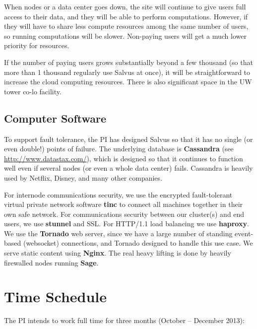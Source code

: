 \documentclass[11pt]{article}
\begin{document}
When nodes or a data center goes down, the site will continue to give
users full access to their data, and they will be able to perform
computations.  However, if they will have to share less compute
resources among the same number of users, so running computations will
be slower.  Non-paying users will get a much lower priority for
resources.   

If the number of paying users grows substantially beyond a few
thousand (so that more than 1 thousand regularly use Salvus at once),
it will be straightforward to increase the cloud computing resources.
There is also significant space in the UW tower co-lo facility.

\subsection{Computer Software}

To support fault tolerance, the PI has designed Salvus so that it has
no single (or even double!) points of failure.  The underlying
database is {\bf Cassandra} (see \url{http://www.datastax.com/}),
which is designed so that it continues to function well even if
several nodes (or even a whole data center) fails.  Cassandra is
heavily used by Netflix, Disney, and many other companies.

For internode communications security, we use the encrypted
fault-tolerant virtual private network software {\bf tinc} to connect
all machines together in their own safe network.  For communications
security between our cluster(s) and end users, we use {\bf stunnel}
and SSL.  For HTTP/1.1 load balancing we use {\bf haproxy}.  We use
the {\bf Tornado} web server, since we have a large number of standing
event-based (websocket) connections, and Tornado designed to handle
this use case.  We serve static content using {\bf Nginx}.  The real
heavy lifting is done by heavily firewalled nodes running {\bf Sage}.


\section{Time Schedule}

The PI intends to work full time for three months (October -- December 2013):
\end{document}

